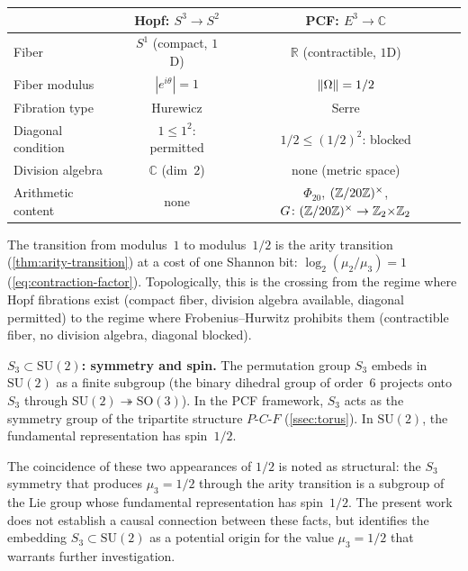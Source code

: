 \begin{center}
\small
\begin{tabular}{lcc}
\toprule
 & Hopf: $S^3\to S^2$ & PCF: $E^3\to\mathbb{C}$ \\
\midrule
Fiber & $S^1$ (compact, $1$D) &
  $\mathbb{R}$ (contractible, $1$D) \\
Fiber modulus & $|e^{i\theta}|=1$ & $\|\Omega\|=1/2$ \\
Fibration type & Hurewicz & Serre \\
Diagonal condition & $1\le 1^2$: permitted &
  $1/2\le (1/2)^2$: blocked \\
Division algebra & $\mathbb{C}$ (dim~$2$) & none (metric space) \\
Arithmetic content & none & $\Phi_{20}$, $(\mathbb{Z}/20\mathbb{Z})^\times$,
  $G\colon(\mathbb{Z}/20\mathbb{Z})^\times\to\mathbb{Z}_2{\times}\mathbb{Z}_2$ \\
\bottomrule
\end{tabular}
\end{center}
The transition from modulus~$1$ to modulus~$1/2$ is the arity
transition (\cref{thm:arity-transition}) at a cost of one
Shannon bit: $\log_2(\mu_2/\mu_3)=1$
(\cref{eq:contraction-factor}).  Topologically, this is the
crossing from the regime where Hopf fibrations exist (compact fiber,
division algebra available, diagonal permitted) to the regime where
Frobenius--Hurwitz prohibits them (contractible fiber, no division
algebra, diagonal blocked).


\smallskip\noindent\textbf{$S_3\subset\mathrm{SU}(2)$: symmetry and spin.}
The permutation group $S_3$ embeds in $\mathrm{SU}(2)$ as a finite
subgroup (the binary dihedral group of order~$6$ projects onto~$S_3$
through $\mathrm{SU}(2)\twoheadrightarrow\mathrm{SO}(3)$).  In the
PCF framework, $S_3$ acts as the symmetry group of the tripartite
structure $P$-$C$-$F$ (\cref{ssec:torus}).  In
$\mathrm{SU}(2)$, the fundamental representation has spin~$1/2$.

The coincidence of these two appearances of $1/2$ is noted as
structural: the $S_3$ symmetry that produces $\mu_3=1/2$ through the
arity transition is a subgroup of the Lie group whose fundamental
representation has spin~$1/2$.  The present work does not establish a
causal connection between these facts, but identifies the embedding
$S_3\subset\mathrm{SU}(2)$ as a potential origin for the value
$\mu_3=1/2$ that warrants further investigation.

